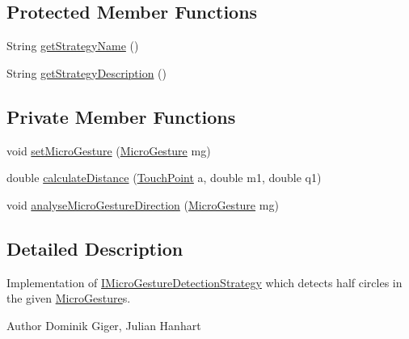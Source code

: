 \subsection*{Protected Member Functions}
\begin{DoxyCompactItemize}
\item 
String \hyperlink{classch_1_1zhaw_1_1ba10__bsha__1_1_1strategies_1_1MicroGestureDetectionStrategyHalfCircle_ab8f20632c110877b3173a3ca6c673bc1}{getStrategyName} ()
\item 
String \hyperlink{classch_1_1zhaw_1_1ba10__bsha__1_1_1strategies_1_1MicroGestureDetectionStrategyHalfCircle_afc528d2770f7e921c54321cdf8e82df3}{getStrategyDescription} ()
\end{DoxyCompactItemize}
\subsection*{Private Member Functions}
\begin{DoxyCompactItemize}
\item 
void \hyperlink{classch_1_1zhaw_1_1ba10__bsha__1_1_1strategies_1_1MicroGestureDetectionStrategyHalfCircle_aa8cae44f2d4c56a05d29eb5a1c53abdd}{setMicroGesture} (\hyperlink{classch_1_1zhaw_1_1ba10__bsha__1_1_1service_1_1MicroGesture}{MicroGesture} mg)
\item 
double \hyperlink{classch_1_1zhaw_1_1ba10__bsha__1_1_1strategies_1_1MicroGestureDetectionStrategyHalfCircle_a41f906c4c42a57ac8d1c6ae417fe6578}{calculateDistance} (\hyperlink{classch_1_1zhaw_1_1ba10__bsha__1_1_1TouchPoint}{TouchPoint} a, double m1, double q1)
\item 
void \hyperlink{classch_1_1zhaw_1_1ba10__bsha__1_1_1strategies_1_1MicroGestureDetectionStrategyHalfCircle_a472dbb75d876bcc2e87a98a0b1afb14c}{analyseMicroGestureDirection} (\hyperlink{classch_1_1zhaw_1_1ba10__bsha__1_1_1service_1_1MicroGesture}{MicroGesture} mg)
\end{DoxyCompactItemize}


\subsection{Detailed Description}
Implementation of \hyperlink{interfacech_1_1zhaw_1_1ba10__bsha__1_1_1strategies_1_1IMicroGestureDetectionStrategy}{IMicroGestureDetectionStrategy} which detects half circles in the given \hyperlink{}{MicroGesture}s.

\begin{DoxyAuthor}{Author}
Dominik Giger, Julian Hanhart 
\end{DoxyAuthor}


